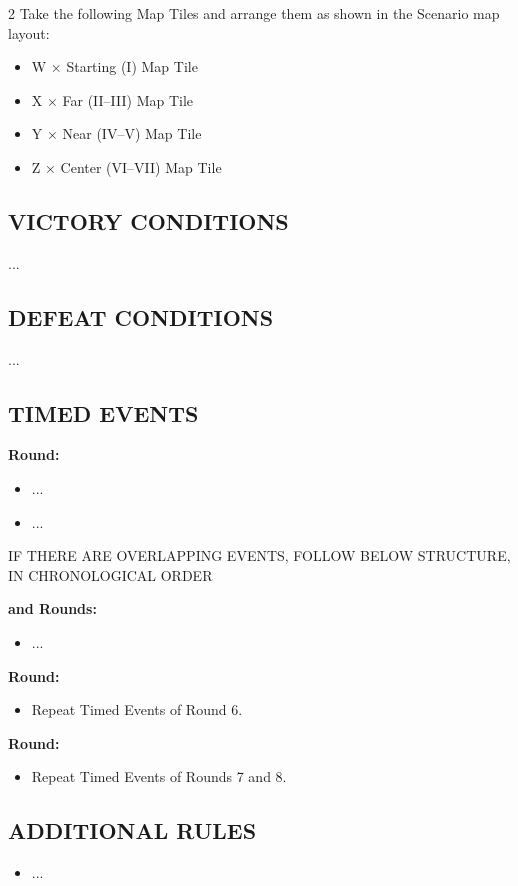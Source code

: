 \begin{multicols*}{2}
Take the following Map Tiles and arrange them as shown in the Scenario map layout:
\begin{itemize}
  \item W × Starting (I) Map Tile
  \item X × Far (II--III) Map Tile
  \item Y × Near (IV--V) Map Tile
  \item Z × Center (VI--VII) Map Tile
\end{itemize}

\subsection*{\MakeUppercase{Victory Conditions}}
...

\subsection*{\MakeUppercase{Defeat Conditions}}
...

\subsection*{\MakeUppercase{Timed Events}}

\textbf{ Round:}
\begin{itemize}
  \item ...
  \item ...
\end{itemize}

 IF THERE ARE OVERLAPPING EVENTS, FOLLOW BELOW STRUCTURE, IN CHRONOLOGICAL ORDER

 \textbf{ and  Rounds:}
 \begin{itemize}
   \item ...
 \end{itemize}

 \textbf{ Round:}
 \begin{itemize}
   \item Repeat Timed Events of Round 6.
 \end{itemize}

 \textbf{ Round:}
 \begin{itemize}
   \item Repeat Timed Events of Rounds 7 and 8.
 \end{itemize}

\subsection*{\MakeUppercase{Additional Rules}}

\begin{itemize}
    \item ...
\end{itemize}

\end{multicols*}

